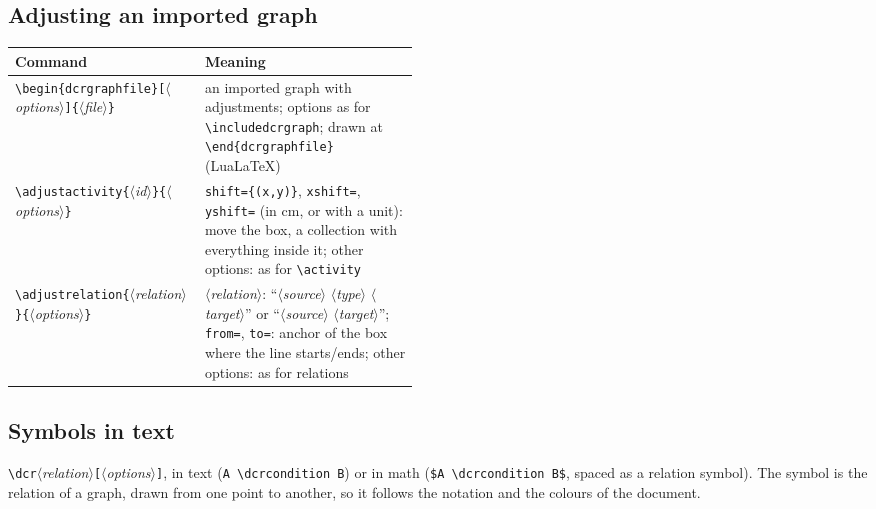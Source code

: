 \documentclass[a4paper,11pt]{article}
\newcommand\cs[1]{\texttt{\textbackslash#1}}
\newcommand\key[1]{\texttt{#1}}
\newcommand\meta[1]{\ensuremath{\langle}\textit{#1}\ensuremath{\rangle}}
\newcommand\marg[1]{\texttt{\{}\meta{#1}\texttt{\}}}
\newcommand\oarg[1]{\texttt{[}\meta{#1}\texttt{]}}
\begin{document}
\subsection{Adjusting an imported graph}
\begin{tabularx}{\linewidth}{@{}>{\raggedright\arraybackslash}p{0.47\linewidth}L@{}}
\toprule
Command & Meaning\\
\midrule
\cs{begin\{dcrgraphfile\}}\oarg{options}\marg{file} & an imported graph with
  adjustments; options as for \cs{includedcrgraph}; drawn at
  \cs{end\{dcrgraphfile\}} (Lua\LaTeX)\\
\cs{adjustactivity}\marg{id}\marg{options} & \key{shift=\{(x,y)\}},
  \key{xshift=}, \key{yshift=} (in cm, or with a unit): move the box, a
  collection with everything inside it; other options: as for \cs{activity}\\
\cs{adjustrelation}\marg{relation}\marg{options} & \meta{relation}:
  ``\meta{source} \meta{type} \meta{target}'' or ``\meta{source} \meta{target}'';
  \key{from=}, \key{to=}: anchor of the box where the line starts/ends;
  other options: as for relations\\
\bottomrule
\end{tabularx}

\subsection{Symbols in text}\label{sec:symbols}
\cs{dcr}\meta{relation}\oarg{options}, in text (\verb|A \dcrcondition B|)
or in math (\verb|$A \dcrcondition B$|, spaced as a relation symbol). The
symbol is the relation of a graph, drawn from one point to another, so it
follows the notation and the colours of the document.
\end{document}
